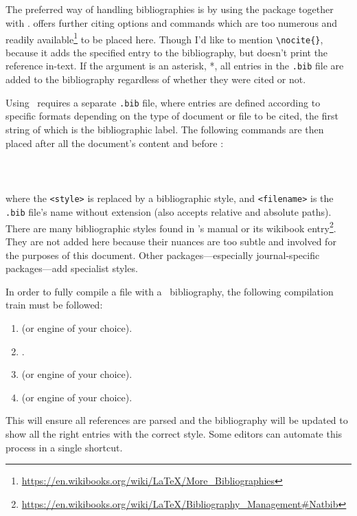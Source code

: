 \subsection{\BibTeX}\label{sb:bib}
%
The preferred way of handling bibliographies is by using the
 package together with \BibTeX.   offers
further citing options and commands which are too numerous and readily
available\footnote{\url{https://en.wikibooks.org/wiki/LaTeX/More_Bibliographies}}
to be placed here.  Though I'd like to mention \verb|\nocite{}|,
because it adds the specified entry to the bibliography, but doesn't
print the reference in-text.  If the argument is an asterisk, *, all
entries in the \verb|.bib| file are added to the bibliography
regardless of whether they were cited or not.

Using \BibTeX~requires a separate \verb|.bib| file, where entries are
defined according to specific formats depending on the type of
document or file to be cited, the first string of which is the
bibliographic label.  The following commands are then placed after all
the document's content and before \verb||:
\begin{verbatim}
    
    
\end{verbatim}
where the \verb|<style>| is replaced by a bibliographic style, and
\verb|<filename>| is the \verb|.bib| file's name without extension
(also accepts relative and absolute paths).  There are many
bibliographic styles found in 's manual or its wikibook
entry\footnote{\url{https://en.wikibooks.org/wiki/LaTeX/Bibliography_Management\#Natbib}}.
They are not added here because their nuances are too subtle and
involved for the purposes of this document.  Other
packages---especially journal-specific packages---add specialist
styles.

In order to fully compile a file with a \BibTeX~bibliography, the
following compilation train must be followed:
\begin{enumerate}
    \item \XeLaTeX (or engine of your choice).
    \item \BibTeX.
    \item \XeLaTeX (or engine of your choice).
    \item \XeLaTeX (or engine of your choice).
\end{enumerate}
This will ensure all references are parsed and the bibliography will
be updated to show all the right entries with the correct style.  Some
editors can automate this process in a single shortcut.
%
